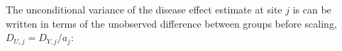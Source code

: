 The unconditional variance of the disease effect estimate at site $j$ is can be written in terms of the unobserved difference between groups before scaling, $D_{U,j}=D_{Y,j}/a_j$: